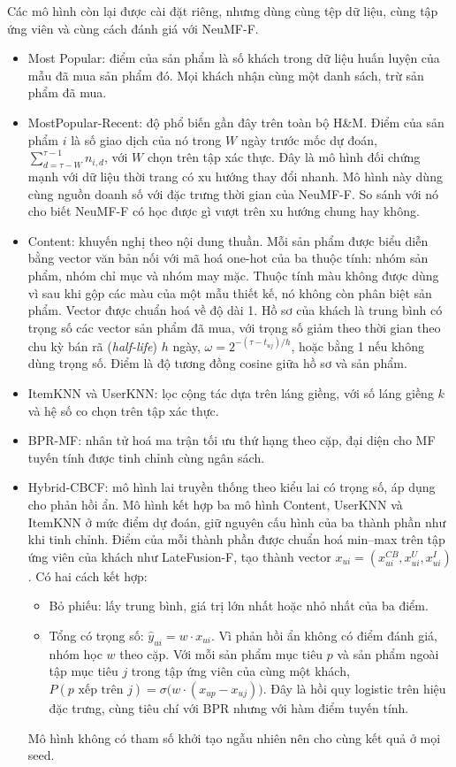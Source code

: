 Các mô hình còn lại được cài đặt riêng, nhưng dùng cùng tệp dữ liệu, cùng tập ứng viên và cùng cách đánh giá với NeuMF-F.
\begin{itemize}
    \item Most Popular: điểm của sản phẩm là số khách trong dữ liệu huấn luyện của mẫu đã mua sản phẩm đó. Mọi khách nhận cùng một danh sách, trừ sản phẩm đã mua.
    \item MostPopular-Recent: độ phổ biến gần đây trên toàn bộ H\&M. Điểm của sản phẩm $i$ là số giao dịch của nó trong $W$ ngày trước mốc dự đoán, $\sum_{d=\tau-W}^{\tau-1} n_{i,d}$, với $W$ chọn trên tập xác thực. Đây là mô hình đối chứng mạnh với dữ liệu thời trang có xu hướng thay đổi nhanh. Mô hình này dùng cùng nguồn doanh số với đặc trưng thời gian của NeuMF-F. So sánh với nó cho biết NeuMF-F có học được gì vượt trên xu hướng chung hay không.
    \item Content: khuyến nghị theo nội dung thuần. Mỗi sản phẩm được biểu diễn bằng vector văn bản nối với mã hoá one-hot của ba thuộc tính: nhóm sản phẩm, nhóm chỉ mục và nhóm may mặc. Thuộc tính màu không được dùng vì sau khi gộp các màu của một mẫu thiết kế, nó không còn phân biệt sản phẩm. Vector được chuẩn hoá về độ dài 1. Hồ sơ của khách là trung bình có trọng số các vector sản phẩm đã mua, với trọng số giảm theo thời gian theo chu kỳ bán rã (\textit{half-life}) $h$ ngày, $\omega = 2^{-(\tau - t_{uj})/h}$, hoặc bằng 1 nếu không dùng trọng số. Điểm là độ tương đồng cosine giữa hồ sơ và sản phẩm.
    \item ItemKNN và UserKNN: lọc cộng tác dựa trên láng giềng, với số láng giềng $k$ và hệ số co chọn trên tập xác thực.
    \item BPR-MF: nhân tử hoá ma trận tối ưu thứ hạng theo cặp, đại diện cho MF tuyến tính được tinh chỉnh cùng ngân sách.
    \item Hybrid-CBCF: mô hình lai truyền thống theo kiểu lai có trọng số, áp dụng cho phản hồi ẩn. Mô hình kết hợp ba mô hình Content, UserKNN và ItemKNN ở mức điểm dự đoán, giữ nguyên cấu hình của ba thành phần như khi tinh chỉnh. Điểm của mỗi thành phần được chuẩn hoá min--max trên tập ứng viên của khách như LateFusion-F, tạo thành vector $x_{ui} = (x^{CB}_{ui}, x^{U}_{ui}, x^{I}_{ui})$. Có hai cách kết hợp:
    \begin{itemize}
        \item Bỏ phiếu: lấy trung bình, giá trị lớn nhất hoặc nhỏ nhất của ba điểm.
        \item Tổng có trọng số: $\hat{y}_{ui} = w \cdot x_{ui}$. Vì phản hồi ẩn không có điểm đánh giá, nhóm học $w$ theo cặp. Với mỗi sản phẩm mục tiêu $p$ và sản phẩm ngoài tập mục tiêu $j$ trong tập ứng viên của cùng một khách, $P(p \text{ xếp trên } j) = \sigma\big(w \cdot (x_{up} - x_{uj})\big)$. Đây là hồi quy logistic trên hiệu đặc trưng, cùng tiêu chí với BPR nhưng với hàm điểm tuyến tính.
    \end{itemize}
    Mô hình không có tham số khởi tạo ngẫu nhiên nên cho cùng kết quả ở mọi seed.
\end{itemize}

